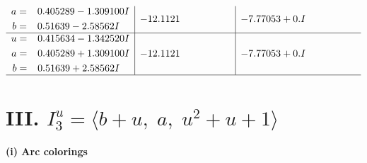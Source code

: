 \documentclass[1p]{elsarticle_modified}
\theoremstyle{definition}
\begin{document}
$$\begin{array}{c|c|c}
\begin{aligned}
a &= \phantom{-}0.405289 - 1.309100 I \\
b &= \phantom{-}0.51639 - 2.58562 I\end{aligned}
 & -12.1121\phantom{ +0.000000I} & -7.77053 + 0. I\phantom{ +0.000000I} \\ \hline\begin{aligned}
u &= \phantom{-}0.415634 - 1.342520 I \\
a &= \phantom{-}0.405289 + 1.309100 I \\
b &= \phantom{-}0.51639 + 2.58562 I\end{aligned}
 & -12.1121\phantom{ +0.000000I} & -7.77053 + 0. I\phantom{ +0.000000I}\\
 \hline 
 \end{array}$$\newpage\newpage\renewcommand{\arraystretch}{1}
\centering \section*{III. $I^u_{3}= \langle b+u,\;a,\;u^2+u+1 \rangle$}
\flushleft \textbf{(i) Arc colorings}\\
\end{document}
